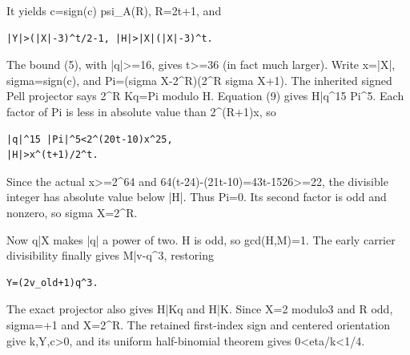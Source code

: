 It yields c=\allowbreak{}sign(c) psi\_\allowbreak{}A(R), R=\allowbreak{}2t+\allowbreak{}1, and



\begin{verbatim}
|Y|>(|X|-3)^t/2-1, |H|>|X|(|X|-3)^t.
\end{verbatim}

The bound (5), with |q|\textgreater{}\allowbreak{}=\allowbreak{}16, gives t\textgreater{}\allowbreak{}=\allowbreak{}36 (in fact much larger). Write x=\allowbreak{}|X|, sigma=\allowbreak{}sign(c), and Pi=\allowbreak{}(sigma X-2\textasciicircum{}\allowbreak{}R)(2\textasciicircum{}\allowbreak{}R sigma X+\allowbreak{}1). The inherited signed Pell projector says 2\textasciicircum{}\allowbreak{}R Kq=\allowbreak{}Pi modulo H. Equation (9) gives H|q\textasciicircum{}\allowbreak{}15 Pi\textasciicircum{}\allowbreak{}5. Each factor of Pi is less in absolute value than 2\textasciicircum{}\allowbreak{}(R+\allowbreak{}1)x, so



\begin{verbatim}
|q|^15 |Pi|^5<2^(20t-10)x^25,
|H|>x^(t+1)/2^t.
\end{verbatim}

Since the actual x\textgreater{}\allowbreak{}=\allowbreak{}2\textasciicircum{}\allowbreak{}64 and 64(t-24)-(21t-10)=\allowbreak{}43t-1526\textgreater{}\allowbreak{}=\allowbreak{}22, the divisible integer has absolute value below |H|. Thus Pi=\allowbreak{}0. Its second factor is odd and nonzero, so sigma X=\allowbreak{}2\textasciicircum{}\allowbreak{}R.



Now q|X makes |q| a power of two. H is odd, so gcd(H,M)=\allowbreak{}1. The early carrier divisibility finally gives M|v-q\textasciicircum{}\allowbreak{}3, restoring



\begin{verbatim}
Y=(2v_old+1)q^3.
\end{verbatim}

The exact projector also gives H|Kq and H|K. Since X=\allowbreak{}2 modulo3 and R odd, sigma=\allowbreak{}+\allowbreak{}1 and X=\allowbreak{}2\textasciicircum{}\allowbreak{}R. The retained first-index sign and centered orientation give k,Y,c\textgreater{}\allowbreak{}0, and its uniform half-binomial theorem gives 0\textless{}\allowbreak{}eta/\allowbreak{}k\textless{}\allowbreak{}1/\allowbreak{}4.



